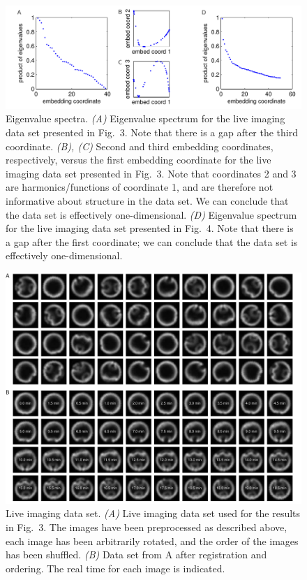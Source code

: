 \documentclass{pnastwo}
\newcommand{\fig}[0]{Fig.}
\begin{document}
\begin{figure}
\includegraphics{figS3}
\caption{Eigenvalue spectra. {\it (A)} Eigenvalue spectrum for the live imaging data set presented in \fig~3. Note that there is a gap after the third coordinate. {\it (B), (C)} Second and third embedding coordinates, respectively, versus the first embedding coordinate for the live imaging data set presented in \fig~3. Note that coordinates 2 and 3 are harmonics/functions of coordinate 1, and are therefore not informative about structure in the data set.  We can conclude that the data set is effectively one-dimensional. {\it (D)} Eigenvalue spectrum for the live imaging data set presented in \fig~4. Note that there is a gap after the first coordinate; we can conclude that the data set is effectively one-dimensional. }
\end{figure}

\begin{figure}
\includegraphics{figS4}
\caption{Live imaging data set. {\it (A)} Live imaging data set used for the results in \fig~3. The images have been preprocessed as described above, each image has been arbitrarily rotated, and the order of the images has been shuffled. {\it (B)} Data set from A after registration and ordering. The real time for each image is indicated. }
\end{figure}
\end{document}
